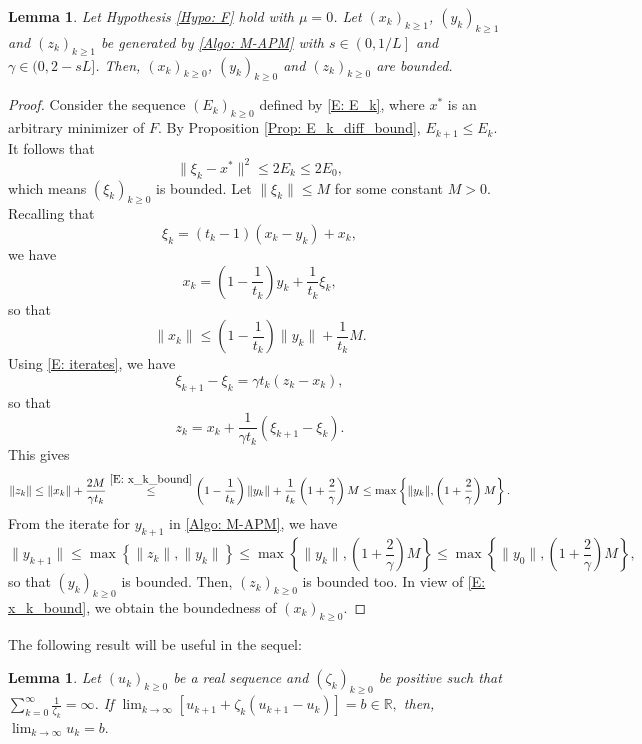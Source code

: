 \documentclass[pdflatex,sn-mathphys-num]{sn-jnl}
\theoremstyle{thmstyleone}
\newtheorem{lemma}[theorem]{Lemma}
\theoremstyle{thmstyletwo}
\theoremstyle{thmstylethree}
\newcommand{\R}{\mathbb{R}}
\begin{document}
\begin{lemma}\label{Lem: bounded_iterates}
Let Hypothesis \ref{Hypo: F} hold with $\mu=0$. Let $(x_k)_{k\ge 1}$, $(y_k)_{k\ge 1}$ and $(z_k)_{k\ge 1}$ be generated by \eqref{Algo: M-APM} with $s\in \left( 0, 1/L \right]$ and $\gamma\in(0,2-sL]$. Then, $(x_k)_{k\ge 0}$, $(y_k)_{k\ge 0}$ and $(z_k)_{k\ge 0}$ are bounded. 
\end{lemma}


\begin{proof}
Consider the sequence $(E_k)_{k\ge 0}$ defined by \eqref{E: E_k}, where $x^*$ is an arbitrary minimizer of $F$. By Proposition \ref{Prop: E_k_diff_bound}, $E_{k+1}\le E_k$. It follows that
$$ \| \xi_k - x^* \|^2 \le 2E_k \le 2E_0, $$
which means $(\xi_k)_{k\ge 0}$ is bounded. Let $\| \xi_k \| \le M$ for some constant $M>0$. 
Recalling that
$$ \xi_k = (t_k-1)(x_k-y_k) + x_k, $$
we have
$$ x_k = \left( 1 - \frac{1}{t_k} \right)y_k + \frac{1}{t_k}\xi_k, $$
so that
\begin{equation}\label{E: x_k_bound}
\| x_k \| \le \left( 1 - \frac{1}{t_k} \right)\| y_k \| + \frac{1}{t_k}M.
\end{equation}
Using \eqref{E: iterates}, we have
\begin{equation}\label{E: xi_k_diff}
\xi_{k+1} - \xi_k = \gamma t_k(z_k-x_k),
\end{equation}
so that
$$ z_k = x_k + \frac{1}{\gamma t_k}(\xi_{k+1}-\xi_k). $$
This gives
$$ \| z_k \| 
\le \| x_k \| + \frac{2M}{\gamma t_k} 
\stackrel{\eqref{E: x_k_bound}}{\le} 
\left( 1 - \frac{1}{t_k} \right)\| y_k \| + \frac{1}{t_k}\left( 1 + \frac{2}{\gamma} \right)M
\le \max\left\{ \| y_k \|, \left( 1 + \frac{2}{\gamma} \right)M \right\}. $$
From the iterate for $y_{k+1}$ in \eqref{Algo: M-APM}, we have
$$\| y_{k+1} \| 
\le \max\left\{ \| z_k \|, \| y_k \| \right\} 
\le \max\left\{ \| y_k \|, \left( 1 + \frac{2}{\gamma} \right)M \right\}
\le \max\left\{ \| y_0 \|, \left( 1 + \frac{2}{\gamma} \right)M \right\},$$
so that $(y_k)_{k\ge 0}$ is bounded. Then, $(z_k)_{k\ge 0}$ is bounded too. In view of \eqref{E: x_k_bound}, we obtain the boundedness of $(x_k)_{k\ge 0}$.
\end{proof}


The following result \cite[Lemma A.4]{Radu_2025} will be useful in the sequel:

\begin{lemma}\label{Lem: convergence_limit}
Let $(u_k)_{k\ge 0}$ be a real sequence and $(\zeta_k)_{k\ge 0}$ be positive such that $\sum_{k=0}^{\infty}\frac{1}{\zeta_k}=\infty$. If
$ \lim_{k\to\infty}[ u_{k+1} + \zeta_k( u_{k+1} - u_k ) ] = b\in\R, $
then,
$ \lim_{k\to\infty}u_k = b. $ 
\end{lemma}
\end{document}
